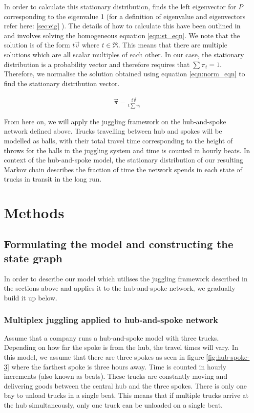 \documentclass{article}
\theoremstyle{definition}
\theoremstyle{remark}
\numberwithin{equation}{section}
\begin{document}
In order to calculate this stationary distribution, \cite[p.110]{Warrington2005} finds the left eigenvector for $P$ corresponding to the eigenvalue 1 (for a definition of eigenvalue and eigenvectors refer here: \ref{sec:eig} ). The details of how to calculate this have been outlined in \cite[p.19--21]{PS2025Week12Lecture} and involves solving the homogeneous equation \ref{eqn:st_eqn}. We note that the solution is of the form $t\vec{v}$ where $t\in \Re$. This means that there are multiple solutions which are all scalar multiples of each other. In our case, the stationary distribution is a probability vector and therefore requires that $\sum{\pi_i} = 1$. Therefore, we normalise the solution obtained using equation \ref{eqn:norm_eqn} to find the stationary distribution vector.

\begin{align}
    \label{eqn:norm_eqn} \vec {\pi} = \frac{t\vec{v}}{t\sum v_i}
\end{align}

From here on, we will apply the juggling framework on the hub-and-spoke network defined above. Trucks travelling between hub and spokes will be modelled as balls, with their total travel time corresponding to the height of throws for the balls in the juggling system and time is counted in hourly beats. In context of the hub-and-spoke model, the stationary distribution of our resulting Markov chain describes the fraction of time the network spends in each state of trucks in transit in the long run.


\section{Methods}

\subsection{Formulating the model and constructing the state graph}


In order to describe our model which utilises the juggling framework described in the sections above and applies it to the hub-and-spoke network, we gradually build it up below.

\subsubsection{Multiplex juggling applied to hub-and-spoke network}
Assume that a company runs a hub-and-spoke model with three trucks. Depending on how far the spoke is from the hub, the travel times will vary. In this model, we assume that there are three spokes as seen in figure \ref{fig:hub-spoke-3} where the farthest spoke is three hours away. Time is counted in hourly increments (also known as beats). These trucks are constantly moving and delivering goods between the central hub and the three spokes. There is only one bay to unload trucks in a single beat. 
This means that if multiple trucks arrive at the hub simultaneously, only one truck can be unloaded on a single beat. 
\end{document}
